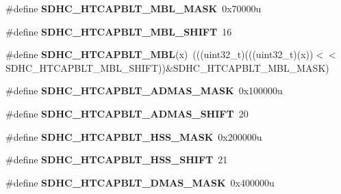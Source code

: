 \begin{DoxyCompactItemize}
\item 
\#define {\bfseries S\+D\+H\+C\+\_\+\+H\+T\+C\+A\+P\+B\+L\+T\+\_\+\+M\+B\+L\+\_\+\+M\+A\+SK}~0x70000u\hypertarget{group__SDHC__Register__Masks_gae49b97c8816777f7f7b5148f2b8ae5c1}{}\label{group__SDHC__Register__Masks_gae49b97c8816777f7f7b5148f2b8ae5c1}

\item 
\#define {\bfseries S\+D\+H\+C\+\_\+\+H\+T\+C\+A\+P\+B\+L\+T\+\_\+\+M\+B\+L\+\_\+\+S\+H\+I\+FT}~16\hypertarget{group__SDHC__Register__Masks_gac68ea213ff8629145f7ad40c9525cffe}{}\label{group__SDHC__Register__Masks_gac68ea213ff8629145f7ad40c9525cffe}

\item 
\#define {\bfseries S\+D\+H\+C\+\_\+\+H\+T\+C\+A\+P\+B\+L\+T\+\_\+\+M\+BL}(x)~(((uint32\+\_\+t)(((uint32\+\_\+t)(x))$<$$<$S\+D\+H\+C\+\_\+\+H\+T\+C\+A\+P\+B\+L\+T\+\_\+\+M\+B\+L\+\_\+\+S\+H\+I\+FT))\&S\+D\+H\+C\+\_\+\+H\+T\+C\+A\+P\+B\+L\+T\+\_\+\+M\+B\+L\+\_\+\+M\+A\+SK)\hypertarget{group__SDHC__Register__Masks_ga10ae4a906c4f6c75b8a4f87b1401114d}{}\label{group__SDHC__Register__Masks_ga10ae4a906c4f6c75b8a4f87b1401114d}

\item 
\#define {\bfseries S\+D\+H\+C\+\_\+\+H\+T\+C\+A\+P\+B\+L\+T\+\_\+\+A\+D\+M\+A\+S\+\_\+\+M\+A\+SK}~0x100000u\hypertarget{group__SDHC__Register__Masks_gadb87583a1db8c53c61fdac8604e1ecc5}{}\label{group__SDHC__Register__Masks_gadb87583a1db8c53c61fdac8604e1ecc5}

\item 
\#define {\bfseries S\+D\+H\+C\+\_\+\+H\+T\+C\+A\+P\+B\+L\+T\+\_\+\+A\+D\+M\+A\+S\+\_\+\+S\+H\+I\+FT}~20\hypertarget{group__SDHC__Register__Masks_ga6ceeb752d9ccad530b178fef829a9db6}{}\label{group__SDHC__Register__Masks_ga6ceeb752d9ccad530b178fef829a9db6}

\item 
\#define {\bfseries S\+D\+H\+C\+\_\+\+H\+T\+C\+A\+P\+B\+L\+T\+\_\+\+H\+S\+S\+\_\+\+M\+A\+SK}~0x200000u\hypertarget{group__SDHC__Register__Masks_gabe87f7e9a2aa3b99012eaae8321aed89}{}\label{group__SDHC__Register__Masks_gabe87f7e9a2aa3b99012eaae8321aed89}

\item 
\#define {\bfseries S\+D\+H\+C\+\_\+\+H\+T\+C\+A\+P\+B\+L\+T\+\_\+\+H\+S\+S\+\_\+\+S\+H\+I\+FT}~21\hypertarget{group__SDHC__Register__Masks_gae24b3d89ddf5bf4bf48ccc6fa948891d}{}\label{group__SDHC__Register__Masks_gae24b3d89ddf5bf4bf48ccc6fa948891d}

\item 
\#define {\bfseries S\+D\+H\+C\+\_\+\+H\+T\+C\+A\+P\+B\+L\+T\+\_\+\+D\+M\+A\+S\+\_\+\+M\+A\+SK}~0x400000u\hypertarget{group__SDHC__Register__Masks_ga5252cbd3675e74a01efa99cf6b754c8a}{}\label{group__SDHC__Register__Masks_ga5252cbd3675e74a01efa99cf6b754c8a}


\end{DoxyCompactItemize}
